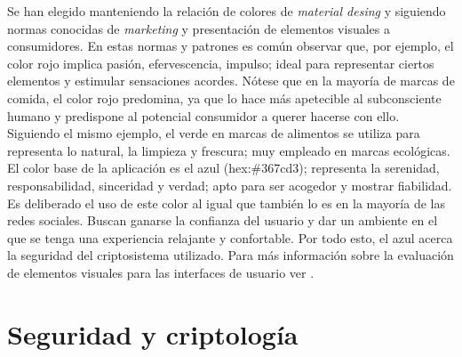 \documentclass[../PFC.tex]{subfiles}
\begin{document}
Se han elegido manteniendo la relación de colores de \textit{material desing} y siguiendo normas conocidas de \textit{marketing} y presentación de elementos visuales a consumidores. En estas normas y patrones es común observar que, por ejemplo, el color rojo implica pasión, efervescencia, impulso; ideal para representar ciertos elementos y estimular sensaciones acordes. Nótese que en la mayoría de marcas de comida, el color rojo predomina, ya que lo hace más apetecible al subconsciente humano y predispone al potencial consumidor a querer hacerse con ello. 
\*
\vspace{0.5515cm}
\\
Siguiendo el mismo ejemplo, el verde en marcas de alimentos se utiliza para representa lo natural, la limpieza y frescura; muy empleado en marcas ecológicas. El color base de la aplicación es el azul (hex:\#367cd3); representa la serenidad, responsabilidad, sinceridad y verdad; apto para ser acogedor y mostrar fiabilidad. Es deliberado el uso de este color al igual que también lo es en la mayoría de las redes sociales. Buscan ganarse la confianza del usuario y dar un ambiente en el que se tenga una experiencia relajante y confortable. Por todo esto, el azul acerca la seguridad del criptosistema utilizado. Para más información sobre la evaluación de elementos visuales para las interfaces de usuario ver \cite{coloresStone}.

\section{Seguridad y criptología}
\label{App:Seguridad y criptología}
\end{document}
